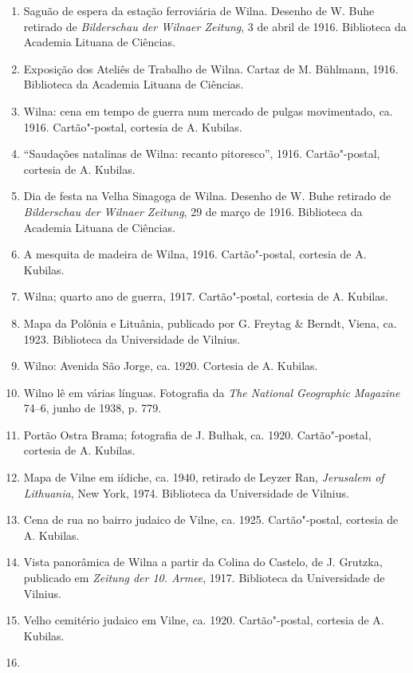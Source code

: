 \begin{enumerate}
  cidade, intitulado ``Garnison"-Umgebungskarte von Wilna'', 1917. Museu
  Nacional Lituano.
\item
  Saguão de espera da estação ferroviária de Wilna. Desenho de W. Buhe
  retirado de \emph{Bilderschau der Wilnaer Zeitung}, 3 de abril de
  1916. Biblioteca da Academia Lituana de Ciências.
\item
  Exposição dos Ateliês de Trabalho de Wilna. Cartaz de M. Bühlmann,
  1916. Biblioteca da Academia Lituana de Ciências.
\item
  Wilna: cena em tempo de guerra num mercado de pulgas movimentado, ca.
  1916. Cartão"-postal, cortesia de A. Kubilas.
\item
  ``Saudações natalinas de Wilna: recanto pitoresco'', 1916.
  Cartão"-postal, cortesia de A. Kubilas.
\item
  Dia de festa na Velha Sinagoga de Wilna. Desenho de W. Buhe retirado
  de \emph{Bilderschau der Wilnaer Zeitung}, 29 de março de 1916.
  Biblioteca da Academia Lituana de Ciências.
\item
  A mesquita de madeira de Wilna, 1916. Cartão"-postal, cortesia de A.
  Kubilas.
\item
  Wilna; quarto ano de guerra, 1917. Cartão"-postal, cortesia de A.
  Kubilas.
\item
  Mapa da Polônia e Lituânia, publicado por G. Freytag \& Berndt, Viena,
  ca. 1923. Biblioteca da Universidade de Vilnius.
\item
  Wilno: Avenida São Jorge, ca. 1920. Cortesia de A. Kubilas.
\item
  Wilno lê em várias línguas. Fotografia da \emph{The National
  Geographic Magazine} 74--6, junho de 1938, p. 779.
\item
  Portão Ostra Brama; fotografia de J. Bułhak, ca. 1920. Cartão"-postal,
  cortesia de A. Kubilas.
\item
  Mapa de Vilne em iídiche, ca. 1940, retirado de Leyzer Ran,
  \emph{Jerusalem of Lithuania}, New York, 1974. Biblioteca da
  Universidade de Vilnius.
\item
  Cena de rua no bairro judaico de Vilne, ca. 1925. Cartão"-postal,
  cortesia de A. Kubilas.
\item
  Vista panorâmica de Wilna a partir da Colina do Castelo, de J.
  Grutzka, publicado em \emph{Zeitung der 10. Armee}, 1917. Biblioteca
  da Universidade de Vilnius.
\item
  Velho cemitério judaico em Vilne, ca. 1920. Cartão"-postal, cortesia de
  A. Kubilas.
\item

\end{enumerate}

